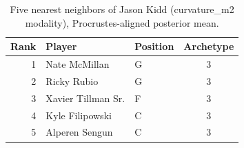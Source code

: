 \begin{table}[htbp]
  \centering\small
  \begin{tabular}{rllc}
    \toprule
    Rank & Player & Position & Archetype \\
    \midrule
    1 & Nate McMillan & G & 3 \\
    2 & Ricky Rubio & G & 3 \\
    3 & Xavier Tillman Sr. & F & 3 \\
    4 & Kyle Filipowski & C & 3 \\
    5 & Alperen Sengun & C & 3 \\
    \bottomrule
  \end{tabular}
  \caption{Five nearest neighbors of Jason Kidd (curvature_m2 modality), Procrustes-aligned posterior mean.}
  \label{tab:Jason_Kidd_neighbors_curvature_m2}
\end{table}

